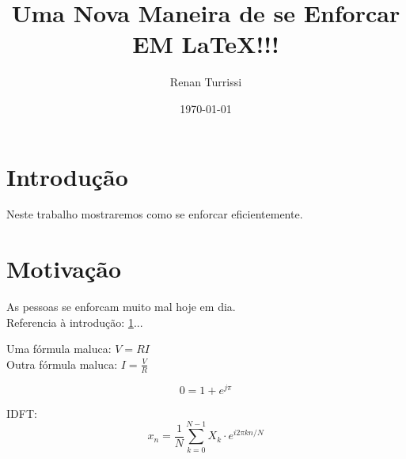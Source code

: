 \documentclass{article}
\author{Renan Turrissi}
\date{\today}
\title{Uma Nova Maneira de se Enforcar EM \LaTeX !!!}
\begin{document}
\maketitle

\newpage

\section{Introdução}\label{sec:intro}
Neste trabalho mostraremos como se enforcar eficientemente.

\section{Motivação}\label{sec:motiv}
As pessoas se enforcam muito mal hoje em dia.\\
Referencia à introdução: \ref{sec:intro}...

Uma fórmula maluca: $ V =RI $ \\
Outra fórmula maluca: $ I = \frac{V}{R} $

$$ 0 = 1+e^{j\pi}  $$

IDFT: $$ x_n = \frac{1}{N}\sum_{k=0}^{N-1} X_k \cdot e^{i2\pi kn/N} $$
\end{document}
